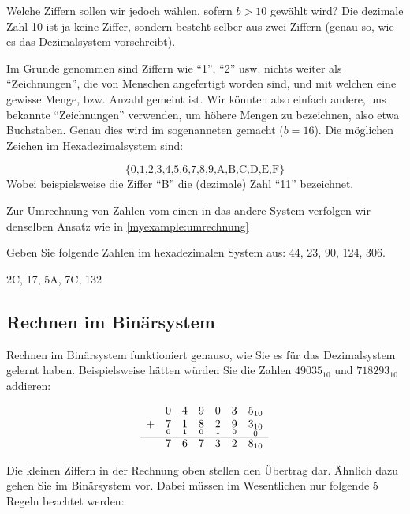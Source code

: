Welche Ziffern sollen wir jedoch wählen, sofern $b>10$ gewählt wird? Die dezimale Zahl 10 ist ja keine Ziffer, sondern besteht selber aus zwei Ziffern (genau so, wie es das Dezimalsystem vorschreibt).

Im Grunde genommen sind Ziffern wie ``1'', ``2'' usw. nichts weiter als ``Zeichnungen'', die von Menschen angefertigt worden sind, und mit welchen eine gewisse Menge, bzw. Anzahl gemeint ist. Wir könnten also einfach andere, uns bekannte ``Zeichnungen'' verwenden, um höhere Mengen zu bezeichnen, also etwa Buchstaben. Genau dies wird im sogenanneten  gemacht ($b=16$). Die möglichen Zeichen im Hexadezimalsystem sind:

\begin{equation*}
\{\text{0,1,2,3,4,5,6,7,8,9,A,B,C,D,E,F}\}
\end{equation*}
Wobei beispielsweise die Ziffer ``B'' die (dezimale) Zahl ``11'' bezeichnet.

Zur Umrechnung von Zahlen vom einen in das andere System verfolgen wir denselben Ansatz wie in \cref{myexample:umrechnung}

\begin{myexercise}
  Geben Sie folgende Zahlen im hexadezimalen System aus: 44, 23, 90, 124, 306.
  \begin{myanswer}
  2C, 17, 5A, 7C, 132
  \end{myanswer}
\end{myexercise}


\subsection{Rechnen im Binärsystem}

Rechnen im Binärsystem funktioniert genauso, wie Sie es für das Dezimalsystem gelernt haben. Beispielsweise hätten würden Sie die Zahlen $49035_{10}$ und $718293_{10}$ addieren:

\[
\begin{array}{ccccccc}
  & 0 & 4 & 9 & 0 & 3 & 5_{10} \\
+ & \underset{0}{7} & \underset{1}{1} & \underset{0}{8} & \underset{1}{2} & \underset{0}{9} & \underset{0}{3_{10}} \\
\hline
 & 7 & 6 & 7 & 3 & 2 & 8_{10} \\
\end{array}
\]

Die kleinen Ziffern in der Rechnung oben stellen den Übertrag dar. Ähnlich dazu gehen Sie im Binärsystem vor. Dabei müssen im Wesentlichen nur folgende 5 Regeln beachtet werden:

